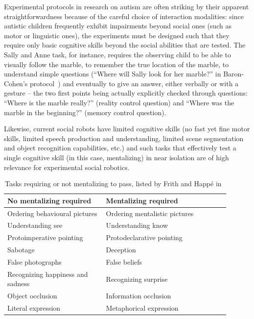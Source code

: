 \documentclass{sig-alternate}
\begin{document}
Experimental protocols in research on autism are often striking by their
apparent straightforwardness because of the careful choice of interaction
modalities: since autistic children frequently exhibit impairments beyond social
ones (such as motor or linguistic ones), the experiments must be designed such
that they require only basic cognitive skills beyond the social abilities that
are tested. The Sally and Anne task, for instance, requires the observing child
to be able to visually follow the marble, to remember the true location of the
marble, to understand simple questions (``Where will Sally look for her
marble?'' in Baron-Cohen's protocol~\cite{baron1985does}) and eventually to give
an answer, either verbally or with a gesture -- the two first points being
actually explicitly checked through questions: ``Where is the marble really?''
(reality control question) and ``Where was the marble in the beginning?'' (memory
control question).

Likewise, current social robots have limited cognitive skills (no fast yet fine
motor skills, limited speech production and understanding, limited scene
segmentation and object recognition capabilities, etc.) and such tasks
that effectively test a single cognitive skill (in this case, mentalizing) in
near isolation are of high relevance for experimental social robotics.

\begin{table}[h]
    \centering
    \begin{tabular}{p{0.4\linewidth}p{0.5\linewidth}}
        \toprule
        No mentalizing required           & Mentalizing required          \\
        \midrule
        Ordering behavioural pictures     & Ordering mentalistic pictures~\cite{baron1986mechanical} \\
        Understanding see                 & Understanding know~\cite{perner1989exploration}            \\
        Protoimperative pointing          & Protodeclarative pointing~\cite{baron1989perceptual}     \\
        Sabotage                          & Deception~\cite{sodian1992deception}                     \\
        False photographs                 & False beliefs~\cite{leslie1992domain}                 \\
        Recognizing happiness and sadness & Recognizing surprise~\cite{baron1993children}          \\
        Object occlusion                  & Information occlusion~\cite{baron1992out}         \\
        Literal expression                & Metaphorical expression~\cite{happe1993communicative}       \\
        \bottomrule
    \end{tabular}
    \caption{\small Tasks requiring or not mentalizing to pass, listed by Frith and Happé in~\cite{frith1994autism}}
    \label{mentalizing-tasks}
\end{table}
\end{document}
